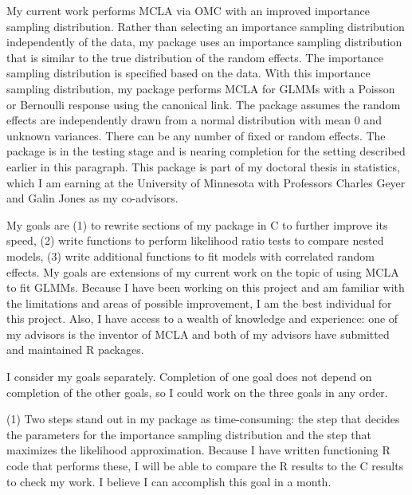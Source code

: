 \documentclass[12pt]{article}
\begin{document}
My current work performs MCLA via OMC with an improved importance sampling distribution.  Rather than selecting an importance sampling distribution independently of the data, my  package uses an importance sampling distribution that is similar to the true distribution of the random effects.  The importance sampling distribution is specified based on the data.  With this importance sampling distribution, my package performs MCLA for GLMMs with a Poisson or Bernoulli response using the canonical link.  The package assumes the random effects are independently drawn from a normal distribution with mean 0 and unknown variances. There can be any number of fixed or random effects.  The package is in the testing stage and is nearing completion for the setting described earlier in this paragraph.  This package is part of my doctoral thesis in statistics, which I am earning at the University of Minnesota with Professors Charles Geyer and Galin Jones as my co-advisors.




My goals are  (1) to rewrite sections of my package in C to further improve its speed, (2) write functions to perform likelihood ratio tests to compare nested models, (3) write additional functions to fit models with correlated random effects.  My goals are extensions of my current  work on the topic of using MCLA to fit GLMMs.  Because I have been working on this project and am familiar with the limitations and areas of possible improvement, I am the best individual for this project.  Also, I have access to a wealth of knowledge and experience: one of my advisors is the inventor of MCLA and both of my advisors have submitted and maintained R packages.




I consider my  goals separately. Completion of one goal does not depend on completion of the other goals, so I could work on the three goals in any order.

(1) Two steps stand out in my package as time-consuming: the step that decides the parameters for the importance sampling distribution and the step that maximizes the likelihood approximation. Because I have written functioning R code that performs these, I will be able to compare the R results to the C results to check my work.  I believe I can accomplish this goal in a month.
\end{document}
